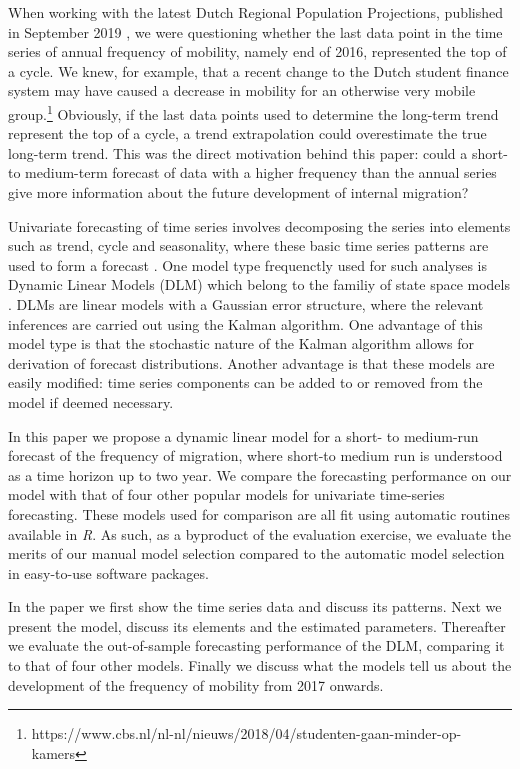 \documentclass[12pt, a4paper]{article}
\begin{document}
When working with the latest Dutch Regional Population Projections,
published in September 2019 \citep{teriele2019}, we were questioning
whether the last data point in the time series of annual frequency of
mobility, namely end of 2016, represented the top of a
cycle. We knew, for example, that a recent change to the Dutch student
finance system may have caused a decrease in mobility for an
otherwise very mobile
group.\footnote{https://www.cbs.nl/nl-nl/nieuws/2018/04/studenten-gaan-minder-op-kamers}
 Obviously, if the last data points used to determine
the long-term trend represent the top of a cycle, a trend extrapolation
could overestimate the true long-term trend. This was the direct motivation behind this paper: could a short- to medium-term forecast of data with a higher frequency than the annual series give more information about the future development of internal migration?

Univariate forecasting of time series involves decomposing the series into elements such as trend, cycle and seasonality, where these basic time series patterns are used to form a forecast \citep{zietz2014us}. One model type frequenctly used for such analyses is Dynamic Linear Models (DLM) which belong to the familiy of state space
models \citep{petris2009dynamic, durbin2012time}. DLMs are linear models with a Gaussian error structure, where the relevant inferences are carried out using the Kalman algorithm. One advantage of this model type is that the stochastic nature of the Kalman algorithm allows for derivation of forecast distributions. Another advantage is that these models are easily modified: time series components can be added to or removed from the model if deemed necessary. 

In this paper we propose a dynamic linear model for a short- to medium-run forecast of the frequency of migration, where short-to medium run is understood as a time horizon up to two year. We compare the forecasting performance on our model with that of four other popular models for univariate time-series
forecasting. These models used for comparison are all fit using automatic routines available
in \emph{R}. As such, as a byproduct of the evaluation exercise, we
evaluate the merits of our manual model selection compared to the
automatic model selection in easy-to-use software packages.

In the paper we first show the time series data and discuss its
patterns. Next we present the model, discuss its elements and the
estimated parameters. Thereafter we evaluate the out-of-sample
forecasting performance of the DLM, comparing it to that of four other
models. Finally we discuss what the models tell us about the development
of the frequency of mobility from 2017 onwards.
\end{document}
